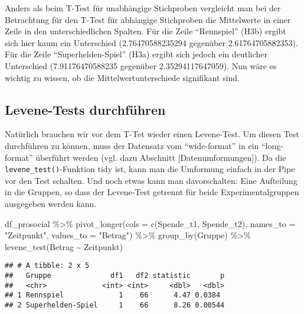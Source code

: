 \documentclass[
]{book}
\newenvironment{Shaded}{\begin{snugshade}}{\end{snugshade}}
\newcommand{\AttributeTok}[1]{\textcolor[rgb]{0.77,0.63,0.00}{#1}}
\newcommand{\FunctionTok}[1]{\textcolor[rgb]{0.00,0.00,0.00}{#1}}
\newcommand{\NormalTok}[1]{#1}
\newcommand{\SpecialCharTok}[1]{\textcolor[rgb]{0.00,0.00,0.00}{#1}}
\newcommand{\StringTok}[1]{\textcolor[rgb]{0.31,0.60,0.02}{#1}}
\begin{document}
Anders als beim T-Test für unabhängige Stichproben vergleicht man bei der Betrachtung für den T-Test für abhängige Stichproben die Mittelwerte in einer Zeile in den unterschiedlichen Spalten. Für die Zeile ``Rennspiel'' (H3b) ergibt sich hier kaum ein Unterschied (2.76470588235294 gegenüber 2.61764705882353). Für die Zeile ``Superhelden-Spiel'' (H3a) ergibt sich jedoch ein deutlicher Unterschied (7.91176470588235 gegenüber 2.35294117647059). Nun wäre es wichtig zu wissen, ob die Mittelwertunterschiede signifikant sind.

\hypertarget{levene-tests-durchfuxfchren}{%
\subsection{Levene-Tests durchführen}\label{levene-tests-durchfuxfchren}}

Natürlich brauchen wir vor dem T-Tet wieder einen Levene-Test. Um diesen Test durchführen zu können, muss der Datensatz vom ``wide-format'' in ein ``long-format'' überführt werden (vgl. dazu Abschnitt {[}Datenumformungen{]}). Da die \texttt{levene\_test()}-Funktion tidy ist, kann man die Umformung einfach in der Pipe vor den Test schalten. Und noch etwas kann man davorschalten: Eine Aufteilung in die Gruppen, so dass der Levene-Test getrennt für beide Experimentalgruppen ausgegeben werden kann.

\begin{Shaded}
\begin{Highlighting}[]
\NormalTok{df\_prosocial }\SpecialCharTok{\%\textgreater{}\%}
  \FunctionTok{pivot\_longer}\NormalTok{(}\AttributeTok{cols =} \FunctionTok{c}\NormalTok{(Spende\_t1, Spende\_t2), }
               \AttributeTok{names\_to =} \StringTok{"Zeitpunkt"}\NormalTok{, }
               \AttributeTok{values\_to =} \StringTok{"Betrag"}\NormalTok{) }\SpecialCharTok{\%\textgreater{}\%} 
  \FunctionTok{group\_by}\NormalTok{(Gruppe) }\SpecialCharTok{\%\textgreater{}\%} 
  \FunctionTok{levene\_test}\NormalTok{(Betrag }\SpecialCharTok{\textasciitilde{}}\NormalTok{ Zeitpunkt)}
\end{Highlighting}
\end{Shaded}

\begin{verbatim}
## # A tibble: 2 x 5
##   Gruppe              df1   df2 statistic       p
##   <chr>             <int> <int>     <dbl>   <dbl>
## 1 Rennspiel             1    66      4.47 0.0384 
## 2 Superhelden-Spiel     1    66      8.26 0.00544
\end{verbatim}
\end{document}
